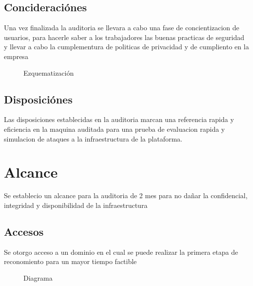 \documentclass[a4paper]{article} %
\begin{document}
    \subsection{Concideraciónes}
    Una vez finalizada la auditoria se llevara a cabo una fase de concientizacion de usuarios, para hacerle saber a los trabajadores
    las buenas practicas de seguridad y llevar a cabo la cumplementura de politicas de privacidad y de cumpliento en la empresa
    \vspace{0.2cm}

    \begin{figure}[h]
        \begin{center}
        \end{center}
        \caption{Ezquematización}
        
    \end{figure}
    \vspace{0.5cm}

    \subsection{Disposiciónes}
    Las disposiciones establecidas en la auditoria marcan una referencia rapida y eficiencia en la maquina auditada para una prueba de evaluacion rapida y simulacion de ataques a la infraestructura de la plataforma. 
    \vspace{1.0cm}
    \section{Alcance}
    Se establecio un alcance para la auditoria de 2 mes para no dañar la confidencial, integridad y disponibilidad de la infraestructura
    \subsection{Accesos}
    Se otorgo acceso a un dominio en el cual se puede realizar la primera etapa de reconomiento para un mayor tiempo factible
    \vspace{0.2cm}
    \begin{figure}[h]
        \begin{center}
        \end{center}
        \caption{Diagrama}
    \end{figure}
   
\end{document}
